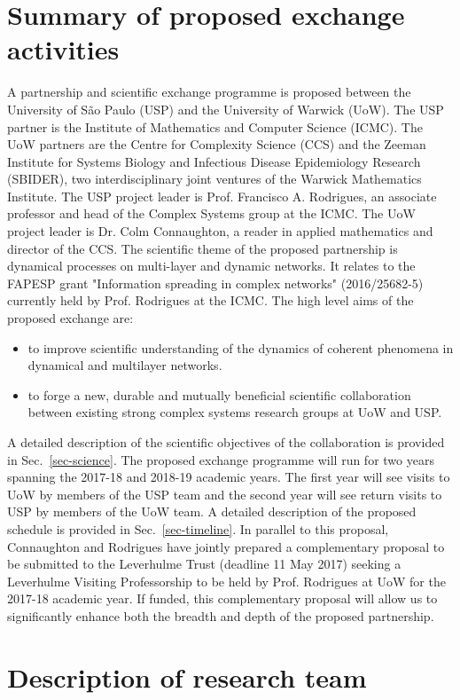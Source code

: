 \section{Summary of proposed exchange activities}
A partnership and scientific exchange programme is proposed between the 
University of S\~{a}o Paulo (USP) and the University of Warwick (UoW). The USP 
partner is the Institute of Mathematics and Computer Science (ICMC). The UoW 
partners are the Centre for Complexity Science (CCS) and the Zeeman Institute 
for Systems Biology and Infectious Disease Epidemiology Research (SBIDER), two  
interdisciplinary joint ventures of the Warwick Mathematics Institute. The USP 
project leader is Prof. Francisco A. Rodrigues, an associate professor and head 
of the Complex Systems group at the ICMC. The UoW project leader is Dr. Colm 
Connaughton, a reader in applied mathematics and director of the CCS. The 
scientific theme  of the proposed partnership is dynamical processes on 
multi-layer and dynamic networks. It relates to the FAPESP grant "Information 
spreading in complex networks" (2016/25682-5) currently held by Prof. Rodrigues 
at the ICMC. The high level aims of the proposed exchange are:
\begin{itemize}
\item to improve scientific understanding of the dynamics of coherent phenomena 
in dynamical and multilayer networks.
\item to forge a new, durable and mutually beneficial scientific collaboration 
between existing strong complex systems research groups at UoW and USP.
\end{itemize}
A detailed description of the scientific objectives of the collaboration is 
provided in Sec.~\ref{sec-science}. The proposed exchange programme will run 
for two years spanning the 2017-18 and 2018-19 academic years. The first year 
will see visits to UoW by members of the USP team and the second year will see 
return visits to USP by members of the UoW team. A detailed description of the 
proposed schedule is provided in Sec.~\ref{sec-timeline}. In parallel to this 
proposal, Connaughton and Rodrigues have jointly prepared a complementary 
proposal to be submitted to the Leverhulme Trust (deadline 11 May 2017) seeking 
a Leverhulme Visiting Professorship to be held by Prof. Rodrigues at UoW for 
the 2017-18 academic year. If funded, this complementary proposal will allow us 
to significantly enhance both the breadth and depth of the proposed partnership.

\section{Description of research team}

